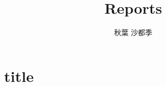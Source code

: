 \documentclass{ltjsarticle}
\begin{document}
\title{Reports}
\author{秋葉 沙都季}
\maketitle

\section{title}
\end{document}
